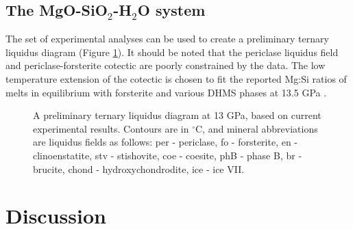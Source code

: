 \documentclass[review]{elsarticle}
\begin{document}

\clearpage
\subsection{The MgO-SiO$_2$-H$_2$O system}
The set of experimental analyses can be used to create a preliminary ternary liquidus diagram (Figure \ref{fig:ternary}). It should be noted that the periclase liquidus field and periclase-forsterite cotectic are poorly constrained by the data. The low temperature extension of the cotectic is chosen to fit the reported Mg:Si ratios of melts in equilibrium with forsterite and various DHMS phases at 13.5 GPa \citep{MSUP2007}. 

 
\begin{figure}[ht!]
  \centering
  \caption{A preliminary ternary liquidus diagram at 13 GPa, based on current experimental results. Contours are in $^{\circ}$C, and mineral abbreviations are liquidus fields as follows: per - periclase, fo - forsterite, en - clinoenstatite, stv - stishovite, coe - coesite, phB - phase B, br - brucite, chond - hydroxychondrodite, ice - ice VII.}
  \label{fig:ternary}
\end{figure}


\section{Discussion}
\end{document}
